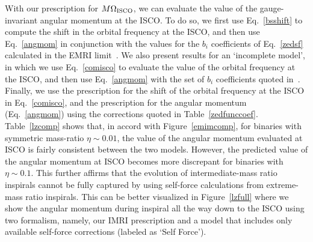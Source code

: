 With our prescription for \(M\Omega_{\rm ISCO}\), we can evaluate the value of the gauge-invariant angular momentum at the ISCO. To do so, we first use Eq.~\eqref{bsshift} to compute the shift in the orbital frequency at the ISCO, and then use Eq.~\eqref{angmom} in conjunction with the values for the \(b_i\) coefficients of Eq.~\eqref{zedsf} calculated in the EMRI limit~\cite{barus}. We also present results for an `incomplete model', in which we use Eq.~\eqref{comisco} to evaluate the value of the orbital frequency at the ISCO, and then use Eq.~\eqref{angmom} with the set of \(b_i\) coefficients quoted in~\cite{barus}. Finally, we use the prescription for the shift of the orbital frequency at the ISCO in Eq.~\eqref{comisco}, and the prescription for the angular momentum (Eq.~\eqref{angmom}) using the corrections quoted in Table~\ref{zedfunccoef}. 
Table~\ref{lzcomp} shows that, in accord with Figure~\ref{emimcomp}, for binaries with symmetric mass-ratio \(\eta \sim 0.01\), the value of the angular momentum evaluated at ISCO is fairly consistent between the two models. However,  the predicted value of the angular momentum at ISCO becomes more discrepant for binaries with   \(\eta \sim 0.1\). This further affirms that the evolution of intermediate-mass ratio inspirals cannot be fully captured by using self-force calculations from extreme-mass ratio inspirals. This can be better visualized in Figure~\ref{lzfull} where we show the angular momentum during inspiral all the way down to the ISCO using two formalism, namely, our IMRI prescription and a model that includes only available self-force corrections (labeled as `Self Force'). 


